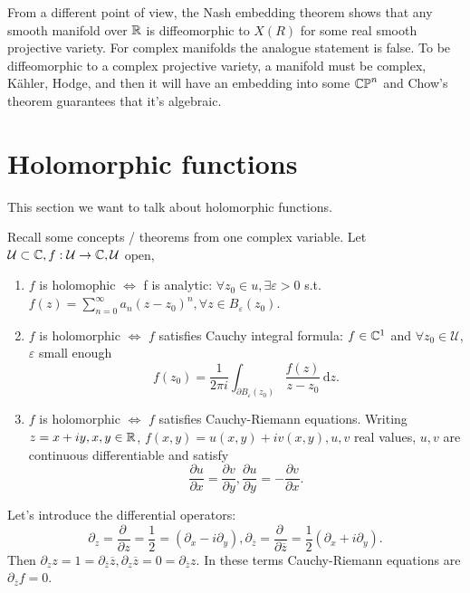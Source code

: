From a different point of view, the Nash embedding theorem shows that any smooth manifold over $\mathbb{R}$ is diffeomorphic to $X(R)$ for some real smooth projective variety.
For complex manifolds the analogue statement is false. To be diffeomorphic to a complex projective variety, a manifold must be complex, K\"{a}hler, Hodge, and then it will have an embedding into some $\mathbb{CP}^{n}$ and Chow's theorem guarantees that it's algebraic.

\section{Holomorphic functions}
This section we want to talk about holomorphic functions.

Recall some concepts / theorems from one complex variable. Let   $\mathcal{U}\subset \mathbb{C}, f:\mathcal{U}\to \mathbb{C}, \mathcal{U}$ open,
\begin{enumerate}
  \item $f$ is holomophic $\Leftrightarrow$ f is analytic: $\forall  z_0 \in  u, \exists \varepsilon >0$ s.t. $f(z)=\sum_{n=0}^{\infty} a_n (z-z_0)^n,\forall z\in B_{\varepsilon }(z_0)$.
  \item  $f$ is holomorphic $\Leftrightarrow$ $f$ satisfies Cauchy integral formula: $f\in \mathbb{C}^{1}$ and $\forall z_0 \in  \mathcal{U}$, $\varepsilon $ small enough 
    \[
      f(z_0)=\frac{1}{2\pi i}\int_{\partial B_\varepsilon (z_0)}\frac{ f(z)}{z-z_0}\,\mathrm{d}z.
    \] 
  \item $f$ is holomorphic $\Leftrightarrow$ $f$ satisfies Cauchy-Riemann equations. Writing $z=x+iy,x,y\in \mathbb{R}$, $f(x,y)=u(x,y)+iv(x,y), u,v$ real values, $u,v$ are continuous differentiable and satisfy
    \[
    \frac{\partial u}{\partial x} =\frac{\partial v}{\partial y},  \frac{\partial u}{\partial y} =-\frac{\partial v}{\partial x} . 
    \] 
\end{enumerate}

Let's introduce the differential operators:
\[
  \partial_z=\frac{\partial ~}{\partial z} =\frac{1}{2}=\left( \partial_x-i\partial_y \right) ,\partial_{\overline{z}}=\frac{\partial ~}{\partial \overline{z}} =\frac{1}{2}\left( \partial_x+i\partial_y \right) .
\] 	
Then $\partial_z z=1=\partial_{\overline{z}}\overline{z},\partial_z\overline{z}=0=\partial_{\overline{z}}z$. In these terms Cauchy-Riemann equations are $\partial_{\overline{z}}f=0$.

